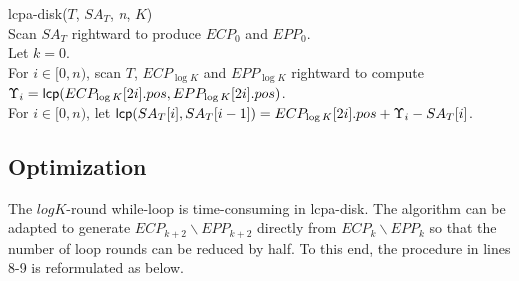 \documentclass[article]{IEEEtran}
\theoremstyle{definition}
\theoremstyle{remark}
\numberwithin{equation}{section}
\begin{document}
\begin{algorithm}[hbtp!]
\caption{Compute $K$-Order $LCPA_T$ in Disk}
\label{fig:alg:em}
lcpa-disk($T$, $SA_T$, {\em n}, $K$){\\
\SetAlgoNoLine
Scan $SA_T$ rightward to produce $ECP_0$ and $EPP_0$.\\
Let $k = 0$. \\
\While{$k < \log K$}{
\Indentp{-1em}
Radix-sort $ECP_k$ and $EPP_k$ by $pos$ to produce $IECP_k$ and $IEPP_k$. \\
For $i\in [0,n)$ and $j\in [0,2n)$, scan $T$ rightward to iteratively compute the finger-print of ${\sf pre}(T,i)$ and assign $FP[0,i]$ to $IECP_k[j].fp$ or $IEPP_k[j].fp$ if $IECP_k[j].pos = i$ or $IEPP_k[j].pos = i$. \\
Radix-sort $IECP_k$ and $IEPP_k$ by $idx$ to reproduce $ECP_k$ and $EPP_k$. \\
For $i \in [0,n)$, scan $ECP_k$ and $EPP_k$ rightward to compute and compare each pair of $(FP[ECP_k[2i].pos+1,ECP_k[2i+1].pos], FP[EPP_k[2i].pos+1,EPP_k[2i+1].pos])$ for generating $ECP_{k+1}$ and $EPP_{k+1}$. \\
Let $k = k + 1$. \\
}
For $i \in [0,n)$, scan $T$, $ECP_{\log K}$ and $EPP_{\log K}$ rightward to compute $\Upsilon_i = {\sf lcp}(ECP_{\log K}[2i].pos,EPP_{\log K}[2i].pos)$. \\
For $i \in [0,n)$, let ${\sf lcp}(SA_T[i],SA_T[i-1])=ECP_{\log K}[2i].pos+\Upsilon_i-SA_T[i]$.\\
}
\end{algorithm}

\subsection{Optimization}\label{subsec:optimization}

The $logK$-round while-loop is time-consuming in lcpa-disk. The algorithm can be adapted to generate $ECP_{k+2}\backslash EPP_{k+2}$ directly from $ECP_k\backslash EPP_k$ so that the number of loop rounds can be reduced by half. To this end, the procedure in lines 8-9 is reformulated as below.
\end{document}

